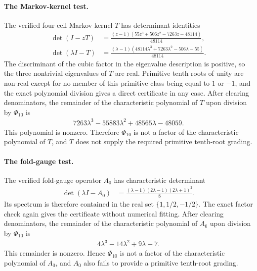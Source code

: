 \paragraph{The Markov-kernel test.}
The verified four-cell Markov kernel $T$ has determinant identities
$$
\begin{aligned}
\det(I-zT)&=\frac{(z-1)(55z^3+506z^2-7263z-48114)}{48114},\\
\det(\lambda I-T)&=\frac{(\lambda-1)(48114\lambda^3+7263\lambda^2-506\lambda-55)}{48114}.
\end{aligned}
$$
The discriminant of the cubic factor in the eigenvalue description is positive, so the three nontrivial eigenvalues of $T$ are real.  Primitive tenth roots of unity are non-real except for no member of this primitive class being equal to $1$ or $-1$, and the exact polynomial division gives a direct certificate in any case.  After clearing denominators, the remainder of the characteristic polynomial of $T$ upon division by $\Phi_{10}$ is
$$
\begin{aligned}
7263\lambda^3-55883\lambda^2+48565\lambda-48059.
\end{aligned}
$$
This polynomial is nonzero.  Therefore $\Phi_{10}$ is not a factor of the characteristic polynomial of $T$, and $T$ does not supply the required primitive tenth-root grading.

\paragraph{The fold-gauge test.}
The verified fold-gauge operator $A_0$ has characteristic determinant
$$
\begin{aligned}
\det(\lambda I-A_0)&=\frac{(\lambda-1)(2\lambda-1)(2\lambda+1)^2}{8}.
\end{aligned}
$$
Its spectrum is therefore contained in the real set $\{1,1/2,-1/2\}$.  The exact factor check again gives the certificate without numerical fitting.  After clearing denominators, the remainder of the characteristic polynomial of $A_0$ upon division by $\Phi_{10}$ is
$$
\begin{aligned}
4\lambda^3-14\lambda^2+9\lambda-7.
\end{aligned}
$$
This remainder is nonzero.  Hence $\Phi_{10}$ is not a factor of the characteristic polynomial of $A_0$, and $A_0$ also fails to provide a primitive tenth-root grading.

